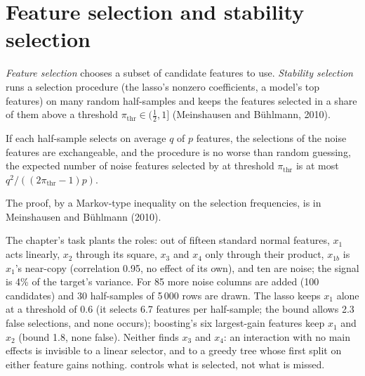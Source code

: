 \section{Feature selection and stability selection}

\begin{definition}\label{def:ml:feature-engineering-selection-and-importance:selection}
\emph{Feature selection} chooses a subset of candidate features to use. \emph{Stability
selection} runs a selection procedure (the lasso's nonzero coefficients, a model's top
features) on many random half-samples and keeps the features selected in a share of them above a threshold
$\pi_{\mathrm{thr}}\in(\frac12, 1]$ (Meinshausen and Bühlmann, 2010).
\end{definition}

\begin{theorem}\label{thm:ml:importance:mb}
If each half-sample selects on average $q$ of $p$ features, the selections of the noise features are exchangeable, and
the procedure is no worse than random guessing, the expected number of noise features selected by  at
threshold $\pi_{\mathrm{thr}}$ is at most $q^2/((2\pi_{\mathrm{thr}} - 1)p)$.
\end{theorem}

\admitted{} The proof, by a Markov-type inequality on the selection frequencies, is in Meinshausen and Bühlmann (2010).

The chapter's task plants the roles: out of fifteen standard normal features, $x_1$ acts linearly, $x_2$ through its
square, $x_3$ and $x_4$ only through their product, $x_{1b}$ is $x_1$'s near-copy (correlation 0.95, no effect of its
own), and ten are noise; the signal is 4\% of the target's variance. For  85 more noise columns are
added (100 candidates) and 30 half-samples of 5\,000 rows are drawn. The lasso keeps $x_1$ alone at a threshold of 0.6
(it selects 6.7 features per half-sample; the bound allows 2.3 false selections, and none occurs); boosting's six
largest-gain features keep $x_1$ and $x_2$ (bound 1.8, none false). Neither finds $x_3$ and $x_4$: an interaction with
no main effects is invisible to a linear selector, and to a greedy tree whose first split on either feature gains
nothing.  controls what is selected, not what is missed.

